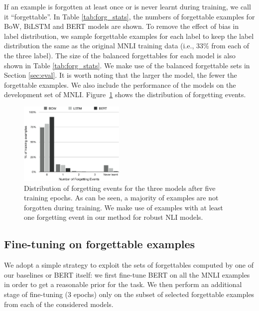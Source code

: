 If an example is forgotten at least once or is never learnt during training, we call it ``forgettable''. %
In Table \ref{tab:forg_stats}, the numbers of forgettable examples for BoW, BiLSTM and BERT models are shown. 
To remove the effect of bias in label distribution, we sample forgettable examples for each label to keep the label distribution the same as the original MNLI training data (i.e., 33\% from each of the three label). The size of the balanced forgettables for each model is also shown in Table \ref{tab:forg_stats}.
We make use of the balanced forgettable sets in Section \ref{sec:eval}.
It is worth noting that the larger the model, the fewer the forgettable examples. We also include the performance of the models on the development set of MNLI.
Figure~\ref{fig:trainingsize-unsup} shows the distribution of forgetting events.

\begin{figure}[t]
\centering
  \includegraphics[width=0.45\textwidth]{figures/bar_chart.png}
  \caption{Distribution of forgetting events for the three models after five training epochs. As can be seen, a majority of examples are not forgotten during training. We make use of examples 
  with at least one forgetting event in our method for robust NLI models.}
\label{fig:trainingsize-unsup}
\end{figure}


\subsection{Fine-tuning on forgettable examples}
We adopt a simple strategy to exploit the sets of forgettables computed by one of our baselines or BERT itself: we first fine-tune BERT on all the MNLI examples in order to get a reasonable prior for the task. We then perform an additional stage of fine-tuning ($3$ epochs) only on the subset of selected forgettable examples from each of the considered models.

